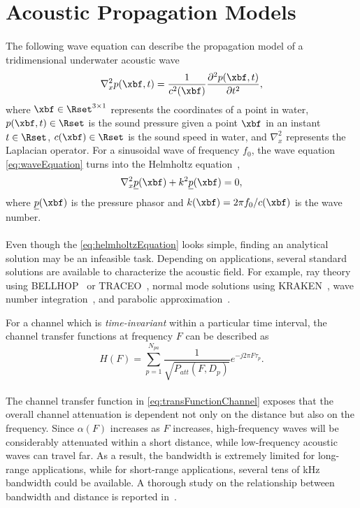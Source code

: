 \section{Acoustic Propagation Models}
\paragraph{}The following wave equation can describe the propagation model of a tridimensional underwater acoustic wave
\begin{equation}\label{eq:waveEquation}
\nabla ^{2}_{x}p(\xbf,t) = \frac{1}{c^{2}(\xbf)}\frac{\partial^{2}p(\xbf,t)}{\partial t^{2}},
\end{equation}
where $\xbf \in \Rset^{3 \times 1}$ represents the coordinates of a point in water, $p(\xbf,t) \in \Rset$ is the sound pressure given a point $\xbf$ in an instant $t \in \Rset$, $c(\xbf) \in \Rset$ is the sound speed in water, and $\nabla ^{2}_{x} $ represents the Laplacian operator. For a sinusoidal wave of frequency $f_{0}$, the wave equation \eqref{eq:waveEquation} turns into the Helmholtz equation~\cite{ShengliZhou2014,Lurton2010},
\begin{equation}\label{eq:helmholtzEquation}
\nabla ^{2}_{x}\underline{p}(\xbf) + k^{2}\underline{p}(\xbf) = 0, 
\end{equation}
where $\underline{p}(\xbf)$ is the pressure phasor and $k(\xbf) = 2\pi f_{0}/c(\xbf)$ is the wave number.
\paragraph{}Even though the \eqref{eq:helmholtzEquation} looks simple, finding an analytical solution may be an infeasible task. Depending on applications, several standard solutions are available to characterize the acoustic field. For example, ray theory using BELLHOP~\cite{PORTER1994} or TRACEO~\cite{Ey2012}, normal mode solutions using KRAKEN~\cite{Porter1992}, wave number integration~\cite{Schmidt2011}, and parabolic approximation~\cite{Smith2001,Senne2012}.

For a channel which is \textit{time-invariant} within a particular time interval, the channel transfer functions at frequency $F$ can be described as
\begin{equation}\label{eq:transFunctionChannel}
H(F) = \sum_{p=1}^{N_{pa}} \frac{1}{\sqrt{P_{att}(F,D_{p}) }} e^{-j2\pi F \tau_{p}}.
\end{equation}
\paragraph{}The channel transfer function in \eqref{eq:transFunctionChannel} exposes that the overall channel attenuation is dependent not only on the distance but also on the frequency. Since $\alpha(F)$ increases as $F$ increases, high-frequency waves will be considerably attenuated within a short distance, while low-frequency acoustic waves can travel far. As a result, the bandwidth is extremely limited for long-range applications, while for short-range applications, several tens of kHz bandwidth could be available. A thorough study on the relationship between bandwidth and distance is reported in~\cite{Stojanovic2007}.

